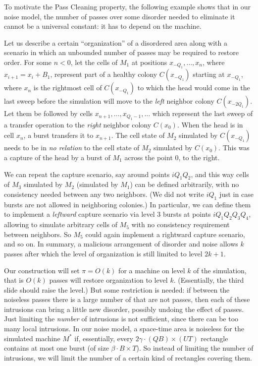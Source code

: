 \documentclass[11pt]{memoir}
\theoremstyle{definition} %
\def\B{B}
\def\U{U}
\newcommand{\passno}{\pi}
\newcommand{\Q}{Q}
\newcommand{\Tu}{T}
\begin{document}
To motivate the Pass Cleaning property, 
the following example shows that in our noise model,
the number of passes over some disorder needed to eliminate it
cannot be a universal constant: it has to depend on the machine.

\begin{example}\label{xpl:unbounded}
  Let us describe a certain ``organization'' of a disordered area along with a scenario
  in which an unbounded number of passes may be required to restore order.
For some \( n<0 \), let the cells of \( M_{1} \) at positions
\( x_{-Q_{1}},\dots,x_{n} \), where \( x_{i+1}=x_{i}+B_{1} \),
represent part of a healthy colony \( C(x_{-Q_{1}}) \) starting at \( x_{-Q_{1}} \), where \( x_{n} \)
is the rightmost cell of \( C(x_{-Q_{1}}) \)
to which the head would come in the last sweep before
the simulation will move to the \emph{left} neighbor colony \( C(x_{-2Q_{1}}) \).
Let them be followed by cells \( x_{n+1},\dots, x_{Q_{1}-1},\dots\)
which represent the last sweep of a transfer operation to the \emph{right} neighbor colony \( C(x_{0}) \).
When the head is in cell \( x_{n} \), a burst transfers it to \( x_{n+1} \).
The cell state of \( M_{2} \) simulated by \( C(x_{-Q_{1}}) \) needs to be in \emph{no relation} to 
the cell state of \( M_{2} \) simulated by \( C(x_{0}) \).
This was a capture of the head by a burst of \( M_{1} \) across the point 0, to the right.

We can repeat the capture scenario, say around points \( i Q_{1}Q_{2} \),
and this way cells of \( M_{3} \) simulated by \( M_{2} \) (simulated by \( M_{1} \))
can be defined arbitrarily, with no consistency needed between any two neighbors.
(We did not write \( i Q_{1} \) just in case bursts are not allowed in neighboring colonies.)
In particular, we can define them to implement a \emph{leftward} capture scenario
via level 3 bursts at points \( i Q_{1}Q_{2}Q_{3}Q_{4} \), allowing to simulate arbitrary cells of \( M_{5} \)
with no consistency requirement between neighbors.
So \( M_{5} \) could again implement a rightward capture scenario, and so on.
In summary, a malicious arrangement of disorder and noise allows \( k \) passes
after which the level of organization is still limited to level \( 2 k + 1 \).
\end{example}

Our construction will set \( \passno=O(k) \) for a machine on level \( k \) of the simulation,
that is \( O(k) \) passes will restore organization to level \( k \).
(Essentially, the third slide should raise the level.)
But some restriction is needed: if between the noiseless passes there is a large number of
 that are not passes, then each of these intrusions can bring a little new disorder, possibly
undoing the effect of passes.
Just limiting the \emph{number}
of intrusions is not sufficient, since there can be too many local intrusions.
In our noise model, a space-time area is noiseless for the simulated machine \( M^{*} \) if,
essentially, every \( 2\gamma\cdot (\Q\B)\times (\U\Tu) \) rectangle contains at most one burst
(of size \( \beta\cdot \B\times \Tu \)).
So instead of limiting the number of intrusions, we will limit the number of a certain kind of rectangles
covering them.
\end{document}
